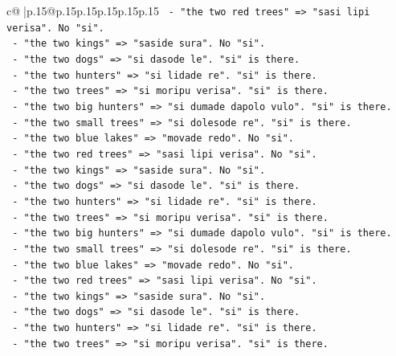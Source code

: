 \documentclass{article}
\begin{document}
{\begin{supertabular}{c@{$\;$}|p{.15\linewidth}@{}p{.15\linewidth}p{.15\linewidth}p{.15\linewidth}p{.15\linewidth}p{.15\linewidth}}
{{{\texttt{                 {-} "the two red trees" => "sasi lipi verisa". No "si".} \\
\texttt{                 {-} "the two kings" => "saside sura". No "si".} \\
\texttt{                 {-} "the two dogs" => "si dasode le". "si" is there.} \\
\texttt{                 {-} "the two hunters" => "si lidade re". "si" is there.} \\
\texttt{                 {-} "the two trees" => "si moripu verisa". "si" is there.} \\
\texttt{                 {-} "the two big hunters" => "si dumade dapolo vulo". "si" is there.} \\
\texttt{                 {-} "the two small trees" => "si dolesode re". "si" is there.} \\
\texttt{                 {-} "the two blue lakes" => "movade redo". No "si".} \\
\texttt{                 {-} "the two red trees" => "sasi lipi verisa". No "si".} \\
\texttt{                 {-} "the two kings" => "saside sura". No "si".} \\
\texttt{                 {-} "the two dogs" => "si dasode le". "si" is there.} \\
\texttt{                 {-} "the two hunters" => "si lidade re". "si" is there.} \\
\texttt{                 {-} "the two trees" => "si moripu verisa". "si" is there.} \\
\texttt{                 {-} "the two big hunters" => "si dumade dapolo vulo". "si" is there.} \\
\texttt{                 {-} "the two small trees" => "si dolesode re". "si" is there.} \\
\texttt{                 {-} "the two blue lakes" => "movade redo". No "si".} \\
\texttt{                 {-} "the two red trees" => "sasi lipi verisa". No "si".} \\
\texttt{                 {-} "the two kings" => "saside sura". No "si".} \\
\texttt{                 {-} "the two dogs" => "si dasode le". "si" is there.} \\
\texttt{                 {-} "the two hunters" => "si lidade re". "si" is there.} \\
\texttt{                 {-} "the two trees" => "si moripu verisa". "si" is there.} \\
}}}
\end{supertabular}}
\end{document}
